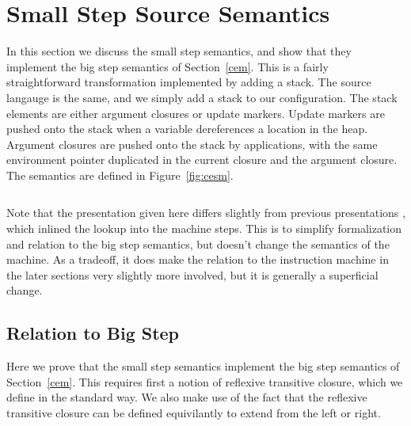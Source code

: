 \section{Small Step Source Semantics} \label{sec:cem_small}

In this section we discuss the small step semantics, and show that they
implement the big step semantics of Section~\ref{cem}. This is a fairly
straightforward transformation implemented by adding a stack. The source
langauge is the same, and we simply add a stack to our configuration. The stack
elements are either argument closures or update markers. Update markers are
pushed onto the stack when a variable dereferences a location in the heap.
Argument closures are pushed onto the stack by applications, with the same
environment pointer duplicated in the current closure and the argument closure. 
The semantics are defined in Figure~\ref{fig:cesm}.  

\begin{figure}
\begin{lstlisting}

\end{lstlisting}
\end{figure}
Note that the presentation given here differs slightly from previous
presentations \cite{cem}, which inlined the lookup into the machine steps. This
is to simplify formalization and relation to the big step semantics, but doesn't
change the semantics of the machine. As a tradeoff, it does make the relation to
the instruction machine in the later sections very slightly more involved, but
it is generally a superficial change.

\subsection{Relation to Big Step}
Here we prove that the small step semantics implement the big step semantics of
Section~\ref{cem}. This requires first a notion of reflexive transitive closure,
which we define in the standard way. We also make use of the fact that the
reflexive transitive closure can be defined equivilantly to extend from the left
or right. 

